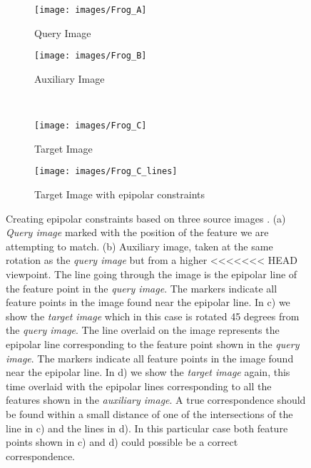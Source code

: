 \documentclass[10pt,journal,cspaper,compsoc]{IEEEtran}
\begin{document}
\begin{figure}[htb]
    \begin{subfigure}[t]{0.48\columnwidth}
        \centering
        \texttt{[image: images/Frog\_A]}
        \caption{Query Image}
        \label{fig:frog_a}
    \end{subfigure}%
    \quad %
    \begin{subfigure}[t]{0.48\columnwidth}
        \centering
        \texttt{[image: images/Frog\_B]}
        \caption{Auxiliary Image}
        \label{fig:frog_b}
    \end{subfigure}%
    \\ %
    \begin{subfigure}[t]{0.48\columnwidth}
        \centering
        \texttt{[image: images/Frog\_C]}
        \caption{Target Image}
        \label{fig:frog_c}
    \end{subfigure}%
    \quad %
    \begin{subfigure}[t]{0.48\columnwidth}
        \centering
        \texttt{[image: images/Frog\_C\_lines]}
        \caption{Target Image with epipolar constraints}
        \label{fig:frog_c_lines}
    \end{subfigure}%
    \caption{Creating epipolar constraints based on three source images \cite{moreels2007evaluation}.  
        (a) \emph{Query image} marked with the position 
        of the feature we are attempting to match. (b) 
        Auxiliary image, taken at the 
        same rotation as the \emph{query image} but from a higher 
<<<<<<< HEAD
        viewpoint. The line going through the image is the epipolar line 
        of the feature point in the \emph{query image}.  The markers 
        indicate all feature points in the image found near the epipolar 
        line.  In c) we show the \emph{target image} which in this case 
        is rotated 45 degrees from the \emph{query image}.  The line 
        overlaid on the image represents the epipolar line corresponding 
        to the feature point shown in the \emph{query image}.  The 
        markers indicate all feature points in the image found near the 
    epipolar line. In d) we show the \emph{target image} again, this 
    time overlaid with the epipolar lines corresponding to all the 
    features shown in the \emph{auxiliary image}. A true correspondence 
    should be found within a small distance of one of the intersections 
    of the line in c) and the lines in d). In this particular case both 
    feature points shown in c) and d) could possible be a correct 
    correspondence.
}%
    \label{fig:frog}%
\end{figure}%
\end{document}
